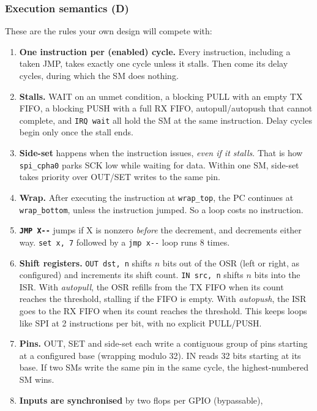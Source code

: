 \subsubsection{Execution semantics (D)}
These are the rules your own design will compete with:
\begin{enumerate}[label=\arabic*.]
  \item \textbf{One instruction per (enabled) cycle.} Every instruction,
    including a taken JMP, takes exactly one cycle unless it stalls. Then
    come its delay cycles, during which the SM does nothing.
  \item \textbf{Stalls.} WAIT on an unmet condition, a blocking PULL with an
    empty TX FIFO, a blocking PUSH with a full RX FIFO, autopull/autopush that
    cannot complete, and \texttt{IRQ wait} all hold the SM at the same
    instruction. Delay cycles begin only once the stall ends.
  \item \textbf{Side-set} happens when the instruction issues, \emph{even if
    it stalls}. That is how \texttt{spi\_cpha0} parks SCK low while waiting
    for data. Within one SM, side-set takes priority over OUT/SET writes to
    the same pin.
  \item \textbf{Wrap.} After executing the instruction at \texttt{wrap\_top},
    the PC continues at \texttt{wrap\_bottom}, unless the instruction
    jumped. So a loop costs no instruction.
  \item \textbf{\texttt{JMP X-{}-}} jumps if X is nonzero \emph{before} the
    decrement, and decrements either way. \texttt{set x, 7} followed by a
    \texttt{jmp x-{}-} loop runs 8 times.
  \item \textbf{Shift registers.} \texttt{OUT dst, n} shifts $n$ bits out of
    the OSR (left or right, as configured) and increments its shift count.
    \texttt{IN src, n} shifts $n$ bits into the ISR. With \emph{autopull},
    the OSR refills from the TX FIFO when its count reaches the threshold,
    stalling if the FIFO is empty. With \emph{autopush}, the ISR goes to the
    RX FIFO when its count reaches the threshold. This keeps loops like SPI
    at 2 instructions per bit, with no explicit PULL/PUSH.
  \item \textbf{Pins.} OUT, SET and side-set each write a contiguous group
    of pins starting at a configured base (wrapping modulo 32). IN reads 32
    bits starting at its base. If two SMs write the same pin in the same
    cycle, the highest-numbered SM wins.
  \item \textbf{Inputs are synchronised} by two flops per GPIO (bypassable),

\end{enumerate}

